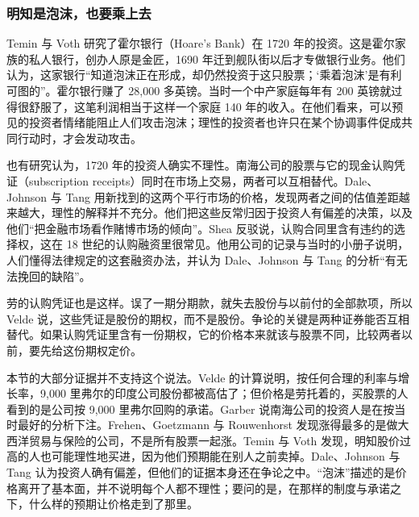 \subsubsection{明知是泡沫，也要乘上去}
Temin 与 Voth 研究了霍尔银行（Hoare's Bank）在 1720 年的投资。这是霍尔家族的私人银行，创办人原是金匠，1690 年迁到舰队街以后才专做银行业务\cite{tv2004}。他们认为，这家银行“知道泡沫正在形成，却仍然投资于这只股票；‘乘着泡沫’是有利可图的”\cite{tv2004}。霍尔银行赚了 28,000 多英镑。当时一个中产家庭每年有 200 英镑就过得很舒服了\cite{tv2004}，这笔利润相当于这样一个家庭 140 年的收入。在他们看来，可以预见的投资者情绪能阻止人们攻击泡沫；理性的投资者也许只在某个协调事件促成共同行动时，才会发动攻击\cite{tv2004}。

也有研究认为，1720 年的投资人确实不理性。南海公司的股票与它的现金认购凭证（subscription receipts）同时在市场上交易，两者可以互相替代。Dale、Johnson 与 Tang 用新找到的这两个平行市场的价格，发现两者之间的估值差距越来越大，理性的解释并不充分。他们把这些反常归因于投资人有偏差的决策，以及他们“把金融市场看作赌博市场的倾向”\cite{djt2005}。Shea 反驳说，认购合同里含有违约的选择权，这在 18 世纪的认购融资里很常见。他用公司的记录与当时的小册子说明，人们懂得法律规定的这套融资办法，并认为 Dale、Johnson 与 Tang 的分析“有无法挽回的缺陷”\cite{shea2007}。

劳的认购凭证也是这样。误了一期分期款，就失去股份与以前付的全部款项，所以 Velde 说，这些凭证是股份的期权，而不是股份\cite{velde2003}。争论的关键是两种证券能否互相替代。如果认购凭证里含有一份期权，它的价格本来就该与股票不同，比较两者以前，要先给这份期权定价。

\begin{pitfall}[泡沫说明买股票的人都失去了理智]
本节的大部分证据并不支持这个说法。Velde 的计算说明，按任何合理的利率与增长率，9,000 里弗尔的印度公司股份都被高估了；但价格是劳托着的，买股票的人看到的是公司按 9,000 里弗尔回购的承诺。Garber 说南海公司的投资人是在按当时最好的分析下注。Frehen、Goetzmann 与 Rouwenhorst 发现涨得最多的是做大西洋贸易与保险的公司，不是所有股票一起涨。Temin 与 Voth 发现，明知股价过高的人也可能理性地买进，因为他们预期能在别人之前卖掉。Dale、Johnson 与 Tang 认为投资人确有偏差，但他们的证据本身还在争论之中。“泡沫”描述的是价格离开了基本面，并不说明每个人都不理性；要问的是，在那样的制度与承诺之下，什么样的预期让价格走到了那里。
\end{pitfall}

